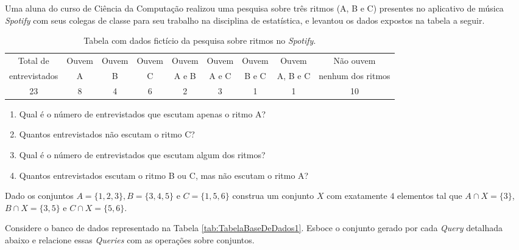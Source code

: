 \begin{exercise}\label{exerc:Conjuntos9}
	Uma aluna do curso de Ciência da Computação realizou uma pesquisa sobre três ritmos (A, B e C) presentes no aplicativo de música \textit{Spotify} com seus colegas de classe para seu trabalho na disciplina de estatística,  e levantou os dados expostos na tabela a seguir.
\end{exercise}

\begin{table}[h]
	\scriptsize
	\centering
	\begin{tabular}{ccccccccc}
		\hline
		Total de & Ouvem & Ouvem & Ouvem & Ouvem & Ouvem &  Ouvem & Ouvem &   Não ouvem \\
		entrevistados & A & B & C & A e B & A e C & B e C & A, B e C & nenhum dos ritmos  \\
		\hline
		23 & 8 & 4 & 6 & 2 & 3 & 1 & 1 & 10\\
		\hline
	\end{tabular}
	\caption{Tabela com dados fictício da pesquisa sobre ritmos no \textit{Spotify}.}
	\label{tab:TabelaDeDados}
\end{table}

\begin{enumerate}
	\item Qual é o número de entrevistados que escutam apenas o ritmo A?
	\item Quantos entrevistados não escutam o ritmo C?
	\item Qual é o número de entrevistados que escutam algum dos ritmos? 
	\item Quantos entrevistados escutam o ritmo B ou C, mas não escutam o ritmo A?
\end{enumerate}

\begin{exercise}\label{exerc:Conjuntos10}
	Dado os conjuntos $A = \{1, 2, 3\}, B = \{3,4,5\}$ e $C = \{1, 5, 6\}$ construa um conjunto $X$ com exatamente $4$ elementos tal que $A \cap X = \{3\}$, $B \cap X =\{3, 5\}$ e $C \cap X = \{5, 6\}$.
\end{exercise}

\begin{exercise}\label{exerc:Conjuntos11}
	Considere o banco de dados representado na Tabela \ref{tab:TabelaBaseDeDados1}. Esboce o conjunto gerado por cada \textit{Query} detalhada abaixo  e relacione essas \textit{Queries} com as operações sobre conjuntos.
\end{exercise}


